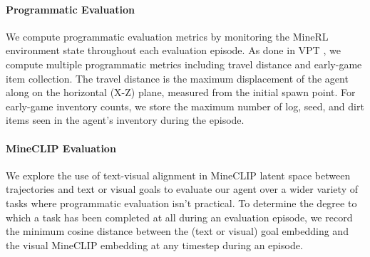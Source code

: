 \paragraph{Programmatic Evaluation}

We compute programmatic evaluation metrics by monitoring the MineRL \citep{guss2019minerl} environment state throughout each evaluation episode. As done in VPT \citep{baker2022vpt}, we compute multiple programmatic metrics including travel distance and early-game item collection. The travel distance is the maximum displacement of the agent along on the horizontal (X-Z) plane, measured from the initial spawn point. For early-game inventory counts, we store the maximum number of log, seed, and dirt items seen in the agent's inventory during the episode. 

\paragraph{MineCLIP Evaluation}

We explore the use of text-visual alignment in MineCLIP latent space between trajectories and text or visual goals to evaluate our agent over a wider variety of tasks where programmatic evaluation isn't practical. To determine the degree to which a task has been completed at all during an evaluation episode, we record the minimum cosine distance between the (text or visual) goal embedding and the visual MineCLIP embedding at any timestep during an episode.

